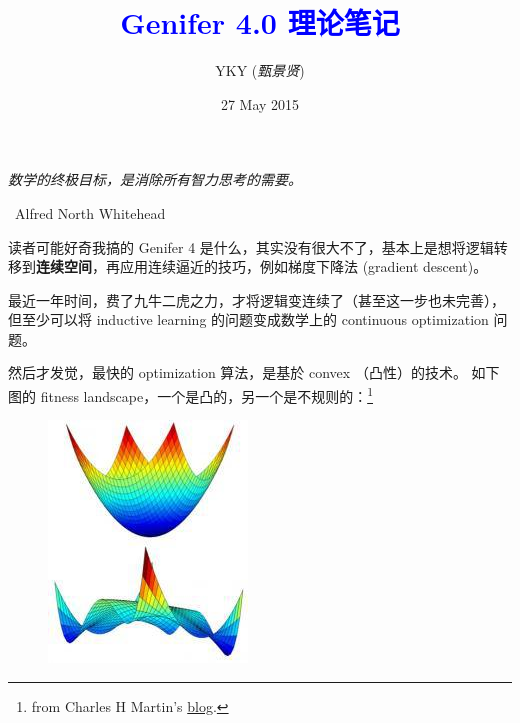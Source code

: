 \documentclass[12pt]{article}
\title{\textcolor{blue}{Genifer 4.0 理论笔记}}
\author{YKY (\textit{甄景贤})}
\date{27 May 2015}
\newcommand{\tab}{\hspace*{1cm}}
\begin{document}
\tab\tab\tab \parbox{9cm}{\textit{数学的终极目标，是消除所有智力思考的需要。}}
\begin{flushright}
\textemdash\, Alfred North Whitehead \hspace{1cm}
\end{flushright}

\sffamily

{\let\newpage\relax\maketitle}

\maketitle
\setlength{\parindent}{0em}
\setlength{\parskip}{1.5ex plus0.5ex minus1.2ex}

读者可能好奇我搞的 Genifer 4 是什么，其实没有很大不了，基本上是想将逻辑转移到\textbf{连续空间}，再应用连续逼近的技巧，例如梯度下降法 (gradient descent)。

最近一年时间，费了九牛二虎之力，才将逻辑变连续了（甚至这一步也未完善），但至少可以将 inductive learning 的问题变成数学上的 continuous optimization 问题。

然后才发觉，最快的 optimization 算法，是基於 convex （凸性）的技术。  如下图的 fitness landscape，一个是凸的，另一个是不规则的：\footnote{from Charles H Martin's \href{https://charlesmartin14.wordpress.com/2013/11/14/metric-learning-some-quantum-statistical-mechanics/}{blog}.}
\begin{figure}[H]
\centering
\includegraphics[scale=0.6]{convex-and-nonconvex.jpg}
\end{figure}
\end{document}
